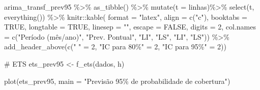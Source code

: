 \documentclass[
  letterpaper,
  DIV=11,
  numbers=noendperiod]{scrartcl}
\newenvironment{Shaded}{\begin{snugshade}}{\end{snugshade}}
\newcommand{\AttributeTok}[1]{\textcolor[rgb]{0.40,0.45,0.13}{#1}}
\newcommand{\CommentTok}[1]{\textcolor[rgb]{0.37,0.37,0.37}{#1}}
\newcommand{\ConstantTok}[1]{\textcolor[rgb]{0.56,0.35,0.01}{#1}}
\newcommand{\DecValTok}[1]{\textcolor[rgb]{0.68,0.00,0.00}{#1}}
\newcommand{\FunctionTok}[1]{\textcolor[rgb]{0.28,0.35,0.67}{#1}}
\newcommand{\NormalTok}[1]{\textcolor[rgb]{0.00,0.23,0.31}{#1}}
\newcommand{\OtherTok}[1]{\textcolor[rgb]{0.00,0.23,0.31}{#1}}
\newcommand{\SpecialCharTok}[1]{\textcolor[rgb]{0.37,0.37,0.37}{#1}}
\newcommand{\StringTok}[1]{\textcolor[rgb]{0.13,0.47,0.30}{#1}}
\begin{document}
\begin{Shaded}
\begin{Highlighting}[]
\NormalTok{arima\_transf\_prev95 }\SpecialCharTok{\%\textgreater{}\%} 
  \FunctionTok{as\_tibble}\NormalTok{() }\SpecialCharTok{\%\textgreater{}\%}
  \FunctionTok{mutate}\NormalTok{(}\AttributeTok{t =}\NormalTok{ linhas)}\SpecialCharTok{\%\textgreater{}\%}
  \FunctionTok{select}\NormalTok{(t, }\FunctionTok{everything}\NormalTok{()) }\SpecialCharTok{\%\textgreater{}\%}
\NormalTok{  knitr}\SpecialCharTok{::}\FunctionTok{kable}\NormalTok{(}
      \AttributeTok{format =} \StringTok{"latex"}\NormalTok{,}
      \AttributeTok{align =} \FunctionTok{c}\NormalTok{(}\StringTok{"c"}\NormalTok{),}
      \AttributeTok{booktabs =} \ConstantTok{TRUE}\NormalTok{,}
      \AttributeTok{longtable =} \ConstantTok{TRUE}\NormalTok{,}
      \AttributeTok{linesep =} \StringTok{""}\NormalTok{,}
      \AttributeTok{escape =} \ConstantTok{FALSE}\NormalTok{,}
      \AttributeTok{digits =} \DecValTok{2}\NormalTok{,}
      \AttributeTok{col.names =} \FunctionTok{c}\NormalTok{(}\StringTok{"Período (mês/ano)"}\NormalTok{, }\StringTok{"Prev. Pontual"}\NormalTok{, }\StringTok{"LI"}\NormalTok{, }\StringTok{"LS"}\NormalTok{, }\StringTok{"LI"}\NormalTok{, }\StringTok{"LS"}\NormalTok{)) }\SpecialCharTok{\%\textgreater{}\%}
    \FunctionTok{add\_header\_above}\NormalTok{(}\FunctionTok{c}\NormalTok{(}\StringTok{" "} \OtherTok{=} \DecValTok{2}\NormalTok{, }\StringTok{"IC para 80\%"} \OtherTok{=} \DecValTok{2}\NormalTok{, }\StringTok{"IC para 95\%"} \OtherTok{=} \DecValTok{2}\NormalTok{))}


\CommentTok{\# ETS}
\NormalTok{ets\_prev95 }\OtherTok{\textless{}{-}} \FunctionTok{f\_ets}\NormalTok{(dados, h)}

\FunctionTok{plot}\NormalTok{(ets\_prev95, }\AttributeTok{main =} \StringTok{"Previsão 95\% de probabilidade de cobertura"}\NormalTok{)}


\end{Highlighting}
\end{Shaded}
\end{document}
